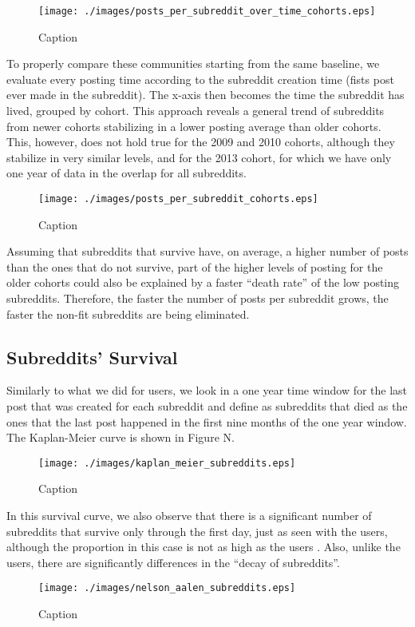 \begin{figure}[!tb]
\centering
\texttt{[image: ./images/posts\_per\_subreddit\_over\_time\_cohorts.eps]}
\caption{Caption}
\label{fig:posts_per_subreddit_over_time_cohorts}
\end{figure}

To properly compare these communities starting from the same baseline, we evaluate every posting time according to the subreddit creation time (fists post ever made in the subreddit). The x-axis then becomes the time the subreddit has lived, grouped by cohort. This approach reveals a general trend of subreddits from newer cohorts stabilizing in a lower posting average than older cohorts. This, however, does not hold true for the 2009 and 2010 cohorts, although they stabilize in very similar levels, and for the 2013 cohort, for which we have only one year of data in the overlap for all subreddits.

\begin{figure}[!tb]
\centering
\texttt{[image: ./images/posts\_per\_subreddit\_cohorts.eps]}
\caption{Caption}
\label{fig:posts_per_subreddit_cohorts}
\end{figure}

Assuming that subreddits that survive have, on average, a higher number of posts than the ones that do not survive, part of the higher levels of posting for the older cohorts could also be explained by a faster ``death rate'' of the low posting subreddits. Therefore, the faster the number of posts per subreddit grows, the faster the non-fit subreddits are being eliminated.

\subsection{Subreddits' Survival}

Similarly to what we did for users, we look in a one year time window for the last post that was created for each subreddit and define as subreddits that died as the ones that the last post happened in the first nine months of the one year window. The Kaplan-Meier curve is shown in Figure N.

\begin{figure}[!tb]
\centering
\texttt{[image: ./images/kaplan\_meier\_subreddits.eps]}
\caption{Caption}
\label{fig:kaplan_meier_subreddits}
\end{figure}

In this survival curve, we also observe that there is a significant number of subreddits that survive only through the first day, just as seen with the users, although the proportion in this case is not as high as the users . Also, unlike the users, there are significantly differences in the ``decay of subreddits''.

\begin{figure}[!tb]
\centering
\texttt{[image: ./images/nelson\_aalen\_subreddits.eps]}
\caption{Caption}
\label{fig:nelson_aalen_subreddits}
\end{figure}